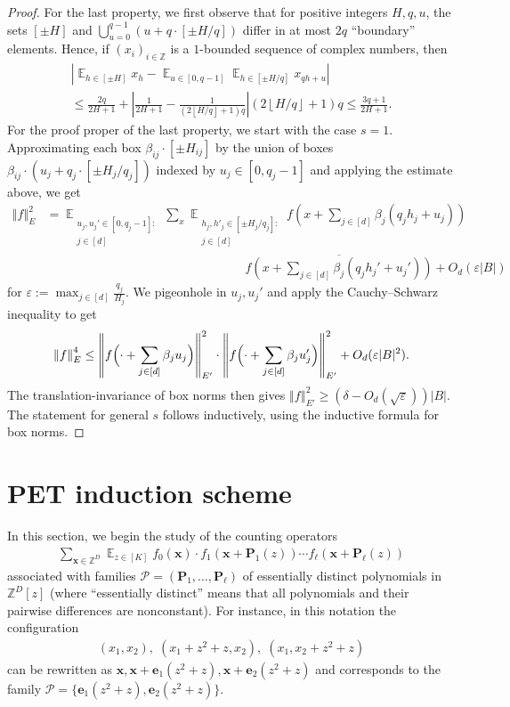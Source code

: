 \documentclass[11pt]{amsart}
\theoremstyle{definition}
\DeclareMathOperator*{\E}{\mathbb{E}}
\newcommand{\Z}{{\mathbb Z}}
\newcommand{\CP}{{\mathcal P}}
\newcommand{\be}{{\mathbf{e}}}
\newcommand{\p}{{\textbf{P}}}
\newcommand{\bx}{{\textbf{x}}}
\newcommand{\norm}[1]{\left\Vert #1\right\Vert}
\newcommand{\veps}{\varepsilon}
\newcommand{\abs}[1]{\mathopen{}\left| #1\mathclose{}\right|}
\newcommand{\brac}[1]{\mathopen{}\left( #1 \mathclose{}\right)}
\newcommand{\Bigbrac}[1]{\Bigl( #1 \Bigr)}
\newcommand{\floor}[1]{\left \lfloor #1 \right \rfloor}
\begin{document}
\begin{proof}
    For the last property, we first observe that for  positive integers $H, q, u$, the sets $[\pm H]$ and $\bigcup\limits_{u=0}^{q-1}(u+q\cdot[\pm H/q])$ differ in at most $2q$ ``boundary'' elements. Hence, if $(x_i)_{i \in \mathbb{Z}}$ is a $1$-bounded sequence of complex numbers, then
    \begin{multline*}
        \abs{\E_{h\in[\pm H]} x_h - \E_{u\in[0,q-1]}\E_{h\in[\pm H/q]} x_{qh + u}}\\
        \leq \frac{2q}{2H+1}+ \abs{\frac{1}{2H+1}-\frac{1}{(2\floor{H/q}+1)q}}(2\floor{H/q}+1)q \leq \frac{3q+1}{2H+1}.
    \end{multline*}
    For the proof proper of the last property, we start with the case $s=1$.
    Approximating each box $\beta_{ij}\cdot[\pm H_{ij}]$ by the union of boxes $\beta_{ij}\cdot(u_j+q_j\cdot[\pm H_j/q_j])$ indexed by $u_j\in[0,q_j-1]$ and applying the estimate above, we get
    \begin{align*}
        \norm{f}_E^2
        &= \E_{\substack{u_j,u_j'\in[0, q_j-1]:\\ j\in[d]}}\sum_x \E_{\substack{h_j, h'_j\in [\pm H_j/q_j]:\\ {j\in[d]}}} f\brac{x+\sum_{j\in [d]}\beta_j (q_j h_j+u_j)}\\
        &\qquad\qquad\qquad\qquad\qquad\qquad\qquad\qquad\overline{f\brac{x+\sum_{j\in [d]}\beta_j (q_j h_j'+u_j')}}+O_d(\veps|B|)
    \end{align*}
    for $\veps := \max_{j\in[d]}\frac{q_j}{H_j}$.
  We pigeonhole in $u_j, u_j'$ and apply
    the Cauchy--Schwarz inequality to get
    \begin{align*}
        \norm{f}_E^4 \leq \norm{f\Bigbrac{\cdot +\sum_{j\in [d]}\beta_j u_j }}_{E'}^2\cdot \norm{f\Bigbrac{\cdot +\sum_{j\in [d]}\beta_j u_j'}}_{E'}^2 + O_d(\veps|B|^2).
    \end{align*}
    The translation-invariance of box norms then gives $\norm{{f}}_{E'}^2\geq (\delta-O_d(\sqrt{\veps}))|B|$.  The statement for general $s$ follows inductively, using the inductive formula for box norms.
\end{proof}


\section{PET induction scheme}\label{S: PET}
In this section, we begin the study of the counting operators
\begin{align}\label{E: counting operator}
	\sum_{\bx\in\Z^D}\E_{z\in[K]} f_0(\bx)\cdot f_1(\bx+\p_1(z))\cdots f_\ell(\bx+\p_\ell(z))
\end{align}
associated with families $\CP = (\p_1, \ldots, \p_\ell)$ of essentially distinct polynomials in $\Z^D[z]$ (where ``essentially distinct'' means that all polynomials and their pairwise differences are nonconstant). For instance, in this notation the configuration
      \begin{align*}
          (x_1, x_2),\; (x_1 + z^2+z, x_2),\; (x_1, x_2+z^2+z)
      \end{align*}
      can be rewritten as $\bx, \bx+\be_1 (z^2+z), \bx + \be_2 (z^2+z)$ and corresponds to the family $\CP = \{\be_1 (z^2+z), \be_2 (z^2+z)\}$.
\end{document}

